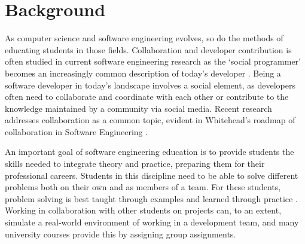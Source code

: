 

\chapter{Background}
As computer science and software engineering evolves, so do the methods of educating students in those fields. Collaboration and developer contribution is often studied in current software engineering research as the `social programmer' becomes an increasingly common description of today's developer \cite{treude2012programming}. Being a software developer in today's landscape involves a social element, as developers often need to collaborate and coordinate with each other or contribute to the knowledge maintained by a community via social media. Recent research addresses collaboration as a common topic, evident in Whitehead's roadmap of collaboration in Software Engineering \cite{whitehead2007collaboration}.

An important goal of software engineering education is to provide students the skills needed to integrate theory and practice, preparing them for their professional careers. Students in this discipline need to be able to solve different problems both on their own and as members of a team. For these students, problem solving is best taught through examples and learned through practice \cite{jazayeri2004education}. Working in collaboration with other students on projects can, to an extent, simulate a real-world environment of working in a development team, and many university courses provide this by assigning group assignments.

